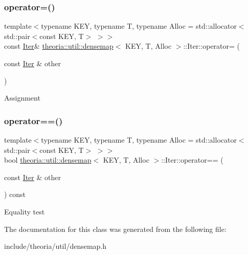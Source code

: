 \subsubsection{\texorpdfstring{operator=()}{operator=()}}
{\footnotesize\ttfamily template$<$typename K\+EY, typename T, typename Alloc = std\+::allocator$<$std\+::pair$<$const K\+E\+Y, T$>$ $>$$>$ \\
const \hyperlink{classtheoria_1_1util_1_1densemap_1_1Iter}{Iter}\& \hyperlink{classtheoria_1_1util_1_1densemap}{theoria\+::util\+::densemap}$<$ K\+EY, T, Alloc $>$\+::Iter\+::operator= (\begin{DoxyParamCaption}\item[{const \hyperlink{classtheoria_1_1util_1_1densemap_1_1Iter}{Iter} \&}]{other }\end{DoxyParamCaption})\hspace{0.3cm}{\ttfamily [inline]}}

Assignment \mbox{\label{classtheoria_1_1util_1_1densemap_1_1Iter_a70b1de08a54e34afd57cce65d093eecb}} 
\subsubsection{\texorpdfstring{operator==()}{operator==()}}
{\footnotesize\ttfamily template$<$typename K\+EY, typename T, typename Alloc = std\+::allocator$<$std\+::pair$<$const K\+E\+Y, T$>$ $>$$>$ \\
bool \hyperlink{classtheoria_1_1util_1_1densemap}{theoria\+::util\+::densemap}$<$ K\+EY, T, Alloc $>$\+::Iter\+::operator== (\begin{DoxyParamCaption}\item[{const \hyperlink{classtheoria_1_1util_1_1densemap_1_1Iter}{Iter} \&}]{other }\end{DoxyParamCaption}) const\hspace{0.3cm}{\ttfamily [inline]}}

Equality test 

The documentation for this class was generated from the following file\+:\begin{DoxyCompactItemize}
\item 
include/theoria/util/densemap.\+h\end{DoxyCompactItemize}
